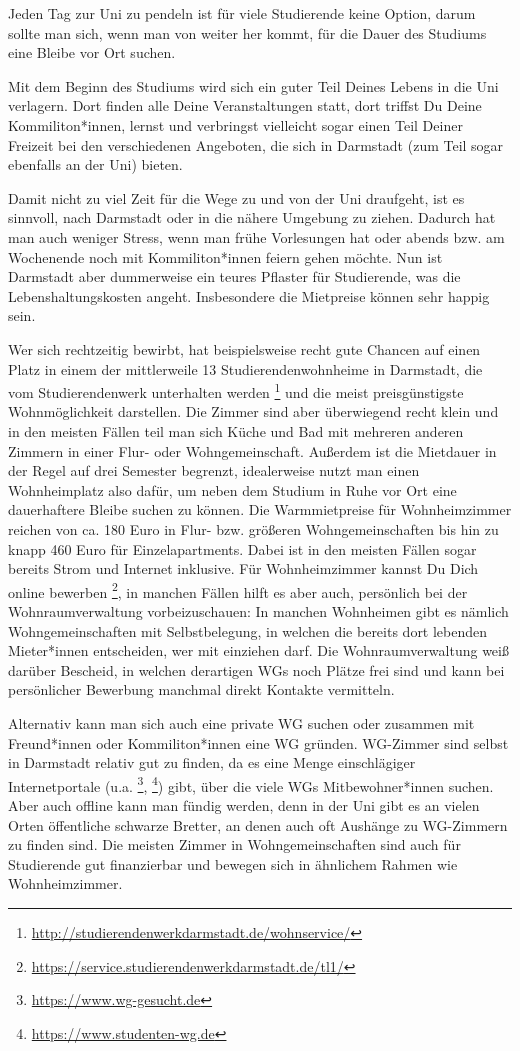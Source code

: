 {Jeden Tag zur Uni zu pendeln ist für viele Studierende keine Option, darum sollte man sich, wenn man von weiter her kommt, für die Dauer des Studiums eine Bleibe vor Ort suchen.
}
{Mit dem Beginn des Studiums wird sich ein guter Teil Deines Lebens in die Uni verlagern. Dort finden alle Deine Veranstaltungen statt, dort triffst Du Deine Kommiliton*innen, lernst und verbringst vielleicht sogar einen Teil Deiner Freizeit bei den verschiedenen Angeboten, die sich in Darmstadt (zum Teil sogar ebenfalls an der Uni) bieten.

Damit nicht zu viel Zeit für die Wege zu und von der Uni draufgeht, ist es sinnvoll, nach Darmstadt oder in die nähere Umgebung zu ziehen. Dadurch hat man auch weniger Stress, wenn man frühe Vorlesungen hat oder abends bzw. am Wochenende noch mit Kommiliton*innen feiern gehen möchte. Nun ist Darmstadt aber dummerweise ein teures Pflaster für Studierende, was die Lebenshaltungskosten angeht. Insbesondere die Mietpreise können sehr happig sein.

Wer sich rechtzeitig bewirbt, hat beispielsweise recht gute Chancen auf einen Platz in einem der mittlerweile 13 Studierendenwohnheime in Darmstadt, die vom Studierendenwerk unterhalten werden \footnote{\url{http://studierendenwerkdarmstadt.de/wohnservice/}} und die meist preisgünstigste Wohnmöglichkeit darstellen. Die Zimmer sind aber überwiegend recht klein und in den meisten Fällen teil man sich Küche und Bad mit mehreren anderen Zimmern in einer Flur- oder Wohngemeinschaft. Außerdem ist die Mietdauer in der Regel auf drei Semester begrenzt, idealerweise nutzt man einen Wohnheimplatz also dafür, um neben dem Studium in Ruhe vor Ort eine dauerhaftere Bleibe suchen zu können. Die Warmmietpreise für Wohnheimzimmer reichen von ca. 180 Euro in Flur- bzw. größeren Wohngemeinschaften bis hin zu knapp 460 Euro für Einzelapartments. Dabei ist in den meisten Fällen sogar bereits Strom und Internet inklusive. Für Wohnheimzimmer kannst Du Dich online bewerben \footnote{\url{https://service.studierendenwerkdarmstadt.de/tl1/}}, in manchen Fällen hilft es aber auch, persönlich bei der Wohnraumverwaltung vorbeizuschauen: In manchen Wohnheimen gibt es nämlich Wohngemeinschaften mit Selbstbelegung, in welchen die bereits dort lebenden Mieter*innen entscheiden, wer mit einziehen darf. Die Wohnraumverwaltung weiß darüber Bescheid, in welchen derartigen WGs noch Plätze frei sind und kann bei persönlicher Bewerbung manchmal direkt Kontakte vermitteln.

Alternativ kann man sich auch eine private WG suchen oder zusammen mit Freund*innen oder Kommiliton*innen eine WG gründen. WG-Zimmer sind selbst in Darmstadt relativ gut zu finden, da es eine Menge einschlägiger Internetportale (u.a. \footnote{\url{https://www.wg-gesucht.de}}, \footnote{\url{https://www.studenten-wg.de}}) gibt, über die viele WGs Mitbewohner*innen suchen. Aber auch offline kann man fündig werden, denn in der Uni gibt es an vielen Orten öffentliche schwarze Bretter, an denen auch oft Aushänge zu WG-Zimmern zu finden sind. Die meisten Zimmer in Wohngemeinschaften sind auch für Studierende gut finanzierbar und bewegen sich in ähnlichem Rahmen wie Wohnheimzimmer. 

}
